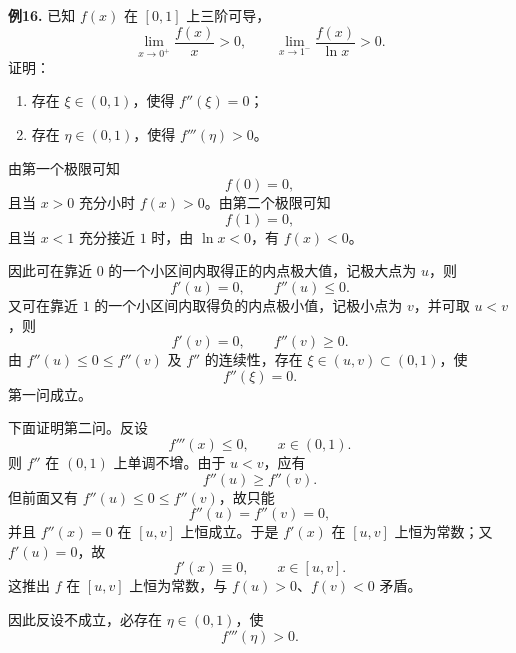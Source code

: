 \begin{problemblock}
\textbf{例16.} 已知 \(f(x)\) 在 \([0,1]\) 上三阶可导，
\[
\lim_{x\to0^+}\frac{f(x)}x>0,\qquad
\lim_{x\to1^-}\frac{f(x)}{\ln x}>0.
\]
证明：
\begin{enumerate}[label=(\arabic*), leftmargin=2.2em]
\item 存在 \(\xi\in(0,1)\)，使得 \(f''(\xi)=0\)；
\item 存在 \(\eta\in(0,1)\)，使得 \(f'''(\eta)>0\)。
\end{enumerate}
\end{problemblock}
\begin{solutionblock}
由第一个极限可知
\[
f(0)=0,
\]
且当 \(x>0\) 充分小时 \(f(x)>0\)。由第二个极限可知
\[
f(1)=0,
\]
且当 \(x<1\) 充分接近 \(1\) 时，由 \(\ln x<0\)，有 \(f(x)<0\)。

因此可在靠近 \(0\) 的一个小区间内取得正的内点极大值，记极大点为 \(u\)，则
\[
f'(u)=0,\qquad f''(u)\le0.
\]
又可在靠近 \(1\) 的一个小区间内取得负的内点极小值，记极小点为 \(v\)，并可取 \(u<v\)，则
\[
f'(v)=0,\qquad f''(v)\ge0.
\]
由 \(f''(u)\le0\le f''(v)\) 及 \(f''\) 的连续性，存在 \(\xi\in(u,v)\subset(0,1)\)，使
\[
f''(\xi)=0.
\]
第一问成立。

下面证明第二问。反设
\[
f'''(x)\le0,\qquad x\in(0,1).
\]
则 \(f''\) 在 \((0,1)\) 上单调不增。由于 \(u<v\)，应有
\[
f''(u)\ge f''(v).
\]
但前面又有 \(f''(u)\le0\le f''(v)\)，故只能
\[
f''(u)=f''(v)=0,
\]
并且 \(f''(x)=0\) 在 \([u,v]\) 上恒成立。于是 \(f'(x)\) 在 \([u,v]\) 上恒为常数；又 \(f'(u)=0\)，故
\[
f'(x)\equiv0,\qquad x\in[u,v].
\]
这推出 \(f\) 在 \([u,v]\) 上恒为常数，与 \(f(u)>0\)、\(f(v)<0\) 矛盾。

因此反设不成立，必存在 \(\eta\in(0,1)\)，使
\[
f'''(\eta)>0.
\]
\end{solutionblock}

